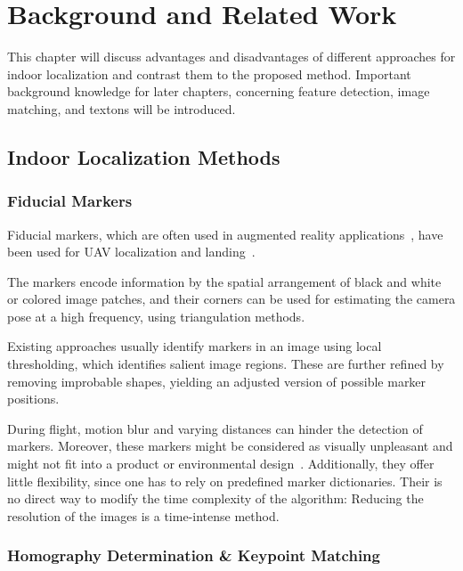 \chapter{Background and Related Work}
\label{chap:relatedwork}

This chapter will discuss advantages and disadvantages of different approaches for indoor localization and
contrast them to the proposed method. Important
background knowledge for later chapters, concerning feature detection,
image matching, and textons will be introduced.

\section{Indoor Localization Methods}

\subsection{Fiducial Markers}
\label{sec:fiducialmarkers}

Fiducial markers, which are often used in augmented reality
applications~\cite{kato1999marker,garrido2014automatic}, have been
used for UAV localization and
landing~\cite{eberli2011vision,bebop2015}.

The markers encode information by the spatial arrangement of
black and white or colored image patches, and their corners can be
used for estimating the camera pose at a high frequency, using
triangulation methods.

Existing approaches usually identify markers in
an image using local thresholding, which identifies salient image
regions. These are further refined by removing improbable shapes,
yielding an adjusted version of possible marker positions.

During flight, motion blur and varying distances can hinder the
detection of markers. Moreover, these markers might be considered as
visually unpleasant and might not fit into a product or environmental
design~\cite{chu2013halftone}. Additionally, they offer little
flexibility, since one has to rely on predefined marker dictionaries.
Their is no direct way to modify the time complexity of the algorithm:
Reducing the resolution of the images is a time-intense method.

\subsection{Homography Determination \& Keypoint Matching}
\label{sec:keypointmatching}

